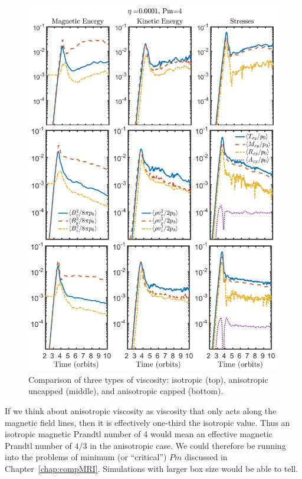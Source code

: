 \begin{figure}[H]
  \begin{center}  
    \includegraphics[width=.95\textwidth, angle=0.]{img/eta1-Pm4-All.png}
  \end{center}
  \caption{Comparison of three types of viscosity: isotropic (top), anisotropic uncapped (middle), and anisotropic capped (bottom).}
  \label{fig:eta1Pm4All}
\end{figure}
%
\noindent If we think about anisotropic viscosity as viscosity that only acts along the magnetic field lines, then it is effectively one-third the isotropic value. Thus an isotropic magnetic Prandtl number of 4 would mean an effective magnetic Prandtl number of $4/3$ in the anisotropic case. We could therefore be running into the problems of minimum (or ``critical'') $Pm$ discussed in Chapter~\ref{chap:compMRI}. Simulations with larger box size would be able to tell.\\
